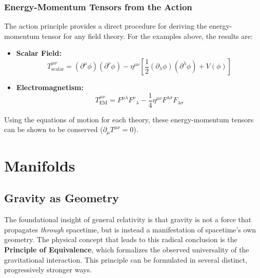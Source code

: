 \documentclass[11pt, a4paper]{report}
\begin{document}
\subsection*{Energy-Momentum Tensors from the Action}

The action principle provides a direct procedure for deriving the energy-momentum tensor for any field theory. For the examples above, the results are:
\begin{itemize}
    \item \textbf{Scalar Field:}
    \begin{equation}
        T^{\mu\nu}_{\text{scalar}} = (\partial^\mu\phi)(\partial^\nu\phi) - \eta^{\mu\nu}\left[\frac{1}{2}(\partial_\lambda\phi)(\partial^\lambda\phi) + V(\phi)\right]
    \end{equation}
    \item \textbf{Electromagnetism:}
    \begin{equation}
        T^{\mu\nu}_{\text{EM}} = {F^{\mu\lambda}}{F^\nu}_\lambda - \frac{1}{4}\eta^{\mu\nu} F^{\lambda\sigma}F_{\lambda\sigma}
    \end{equation}
\end{itemize}
Using the equations of motion for each theory, these energy-momentum tensors can be shown to be conserved ($\partial_\mu T^{\mu\nu} = 0$).


\chapter{Manifolds}

\section{Gravity as Geometry}

The foundational insight of general relativity is that gravity is not a force that propagates \emph{through} spacetime, but is instead a manifestation of spacetime's own geometry. The physical concept that leads to this radical conclusion is the \textbf{Principle of Equivalence}, which formalizes the observed universality of the gravitational interaction. This principle can be formulated in several distinct, progressively stronger ways.
\end{document}
